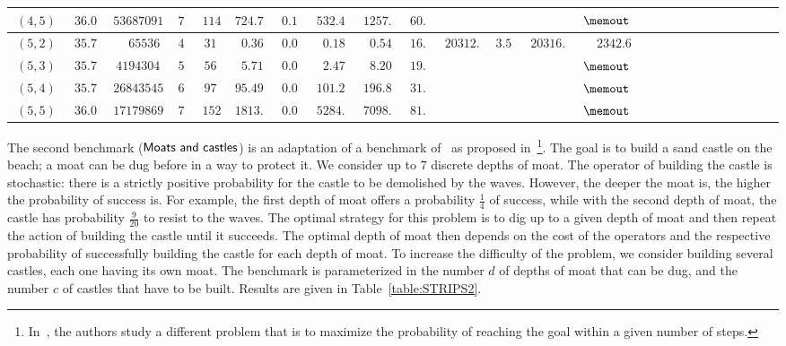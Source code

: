 \begin{table}[h!]
\begin{tabular}{|r|r|r||r|r|r|r|r|r|r||r|r|r|r|r|r|r|r|r|r|r|r|r|r|r|}
$\ (4,5)\ $ & $\ 36.00\ $ & $\ 536870912\ $ & $\ 7\ $ & $\ 114\ $ & $\ 724.77\ $ & $\ 0.11\ $ & $\ 532.46\ $  & $\ 1257.41\ $ & $\ 60.9\ $ & $\ \ $ & $\ \ $  & $\ \ $ & $\ \memout\ $\rule[-3pt]{0pt}{10pt}\\
\hline $\ (5,2)\ $ & $\ 35.75\ $ & $\ 65536\ $ & $\ 4\ $ & $\ 31\ $ & $\ 0.36\ $ & $\ 0.00\ $ & $\ 0.18\ $  & $\ 0.54\ $ & $\ 16.6\ $ & $\ 20312.67\ $ & $\ 3.50\ $  & $\ 20316.17\ $ & $\ 2342.6\ $\rule[-3pt]{0pt}{10pt}\\
$\ (5,3)\ $ & $\ 35.75\ $ & $\ 4194304\ $ & $\ 5\ $ & $\ 56\ $ & $\ 5.71\ $ & $\ 0.02\ $ & $\ 2.47\ $  & $\ 8.20\ $ & $\ 19.5\ $ & $\ \ $ & $\ \ $  & $\ \ $ & $\ \memout\ $\rule[-3pt]{0pt}{10pt}\\
$\ (5,4)\ $ & $\ 35.75\ $ & $\ 268435456\ $ & $\ 6\ $ & $\ 97\ $ & $\ 95.49\ $ & $\ 0.04\ $ & $\ 101.27\ $  & $\ 196.83\ $ & $\ 31.3\ $ & $\ \ $ & $\ \ $  & $\ \ $ & $\ \memout\ $\rule[-3pt]{0pt}{10pt}\\
$\ (5,5)\ $ & $\ 36.00\ $ & $\ 17179869184\ $ & $\ 7\ $ & $\ 152\ $ & $\ 1813.78\ $ & $\ 0.08\ $ & $\ 5284.31\ $  & $\ 7098.40\ $ & $\ 81.3\ $ & $\ \ $ & $\ \ $  & $\ \ $ & $\ \memout\ $\rule[-3pt]{0pt}{10pt}\\
\hline
		\end{tabular}
		\normalsize
\end{table}

The second benchmark ($\sf{Moats~and~castles}$) is an adaptation of a benchmark of~\cite{DBLP:conf/aips/MajercikL98} as proposed in~\cite{blum2000probabilistic}\footnote{In~\cite{blum2000probabilistic}, the authors study a different problem that is to maximize the probability of reaching the goal within a given number of steps.}. The goal is to build a sand castle on the beach; a moat can be dug before in a way to protect it. We consider up to $7$ discrete depths of moat. The operator of building the castle is stochastic: there is a strictly positive probability for the castle to be demolished by the waves. However, the deeper the moat is, the higher the probability of success is. For example, the first depth of moat offers a probability $\frac{1}{4}$ of success, while with the second depth of moat, the castle has probability $\frac{9}{20}$ to resist to the waves. The optimal strategy for this problem is to dig up to a given depth of moat and then repeat the action of building the castle until it succeeds. The optimal depth of moat then depends on the cost of the operators and the respective probability of successfully building the castle for each depth of moat. To increase the difficulty of the problem, we consider building several castles, each one having its own moat. The benchmark is parameterized in the number $d$ of depths of moat that can be dug, and the number $c$ of castles that have to be built. Results are given in Table~\ref{table:STRIPS2}.

